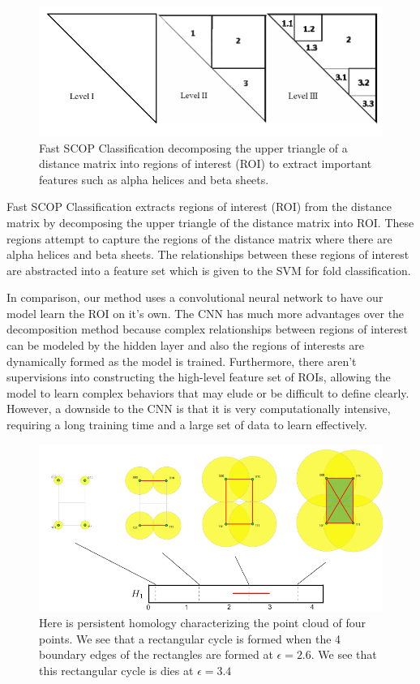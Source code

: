 \documentclass[12pt, a4paper, twocolumn, fullpage]{article}
\theoremstyle{plain}
\theoremstyle{definition}
\theoremstyle{remark}
\begin{document}
\begin{figure}
	\centering
    \includegraphics[width=.9\linewidth]{img/fastSCOP/ROIdecomp.png}
    \caption{Fast SCOP Classification decomposing the upper triangle of a distance matrix into regions of interest (ROI) to extract important features such as alpha helices and beta sheets.}
    \label{}
\end{figure}


Fast SCOP Classification extracts regions of interest (ROI) from the distance matrix by decomposing the upper triangle of the distance matrix into ROI. These regions attempt to capture the regions of the distance matrix where there are alpha helices and beta sheets. The relationships between these regions of interest are abstracted into a feature set which is given to the SVM for fold classification.

In comparison, our method uses a convolutional neural network to have our model learn the ROI on it's own. The CNN has much more advantages over the decomposition method because complex relationships between regions of interest can be modeled by the hidden layer and also the regions of interests are dynamically formed as the model is trained. Furthermore, there aren't supervisions into constructing the high-level feature set of ROIs, allowing the model to learn complex behaviors that may elude or be difficult to define clearly. However, a downside to the CNN is that it is very computationally intensive, requiring a long training time and a large set of data to learn effectively.

\begin{figure}
	\centering
    \includegraphics[width=\linewidth]{img/hom/persistentHomEx.png}
    \caption{Here is persistent homology characterizing the point cloud of four points. We see that a rectangular cycle is formed when the 4 boundary edges of the rectangles are formed at $\epsilon = 2.6$. We see that this rectangular cycle is dies at   $\epsilon = 3.4$}
    \label{fig:persistentHomEx}
\end{figure}
\end{document}
